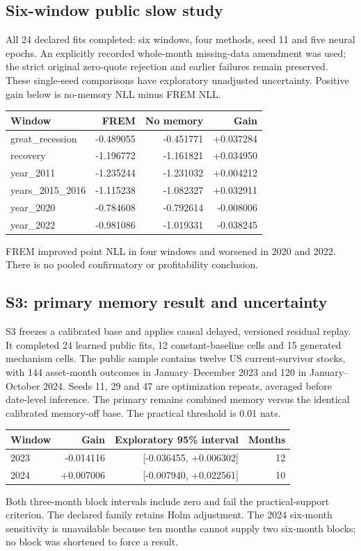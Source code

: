 \subsection{Six-window public slow study}
All 24 declared fits completed: six windows, four methods, seed 11 and five neural epochs. An explicitly recorded whole-month missing-data amendment was used; the strict original zero-quote rejection and earlier failures remain preserved. These single-seed comparisons have exploratory unadjusted uncertainty. Positive gain below is no-memory NLL minus FREM NLL.
\begin{center}
\begin{tabular}{lrrr}
\toprule
Window & FREM & No memory & Gain \\
\midrule
great\_recession & -0.489055 & -0.451771 & +0.037284 \\
recovery & -1.196772 & -1.161821 & +0.034950 \\
year\_2011 & -1.235244 & -1.231032 & +0.004212 \\
years\_2015\_2016 & -1.115238 & -1.082327 & +0.032911 \\
year\_2020 & -0.784608 & -0.792614 & -0.008006 \\
year\_2022 & -0.981086 & -1.019331 & -0.038245 \\
\bottomrule
\end{tabular}
\end{center}
FREM improved point NLL in four windows and worsened in 2020 and 2022. There is no pooled confirmatory or profitability conclusion.

\subsection{S3: primary memory result and uncertainty}
S3 freezes a calibrated base and applies causal delayed, versioned residual replay. It completed 24 learned public fits, 12 constant-baseline cells and 15 generated mechanism cells. The public sample contains twelve US current-survivor stocks, with 144 asset-month outcomes in January--December 2023 and 120 in January--October 2024. Seeds 11, 29 and 47 are optimization repeats, averaged before date-level inference. The primary remains combined memory versus the identical calibrated memory-off base. The practical threshold is 0.01 nats.
\begin{center}
\begin{tabular}{lrrr}
\toprule
Window & Gain & Exploratory 95\% interval & Months \\
\midrule
2023 & -0.014116 & [-0.036455, +0.006302] & 12 \\
2024 & +0.007006 & [-0.007940, +0.022561] & 10 \\
\bottomrule
\end{tabular}
\end{center}
Both three-month block intervals include zero and fail the practical-support criterion. The declared family retains Holm adjustment. The 2024 six-month sensitivity is unavailable because ten months cannot supply two six-month blocks; no block was shortened to force a result.

